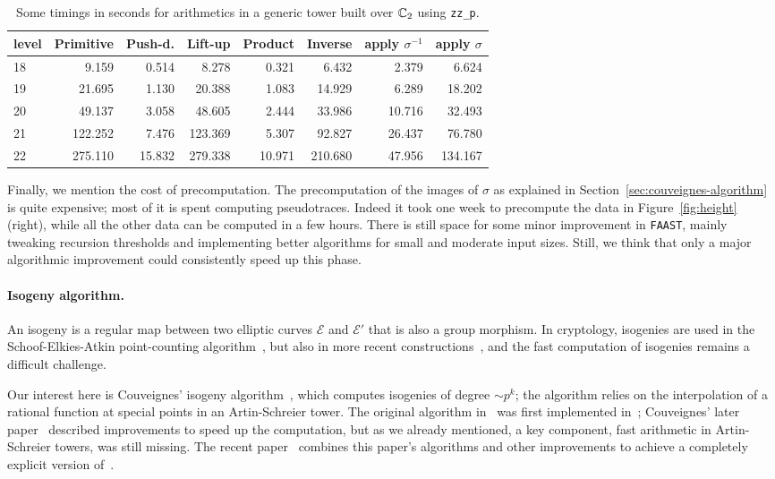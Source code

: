 \begin{table}
  \centering
  \begin{tabular}{l | r | r | r | r | r | r | r}
    level & Primitive & Push-d. & Lift-up & Product & Inverse & apply $\sigma^{-1}$ & apply $\sigma$ \\
    \hline
    18 &   9.159 &  0.514 &   8.278 &  0.321 &   6.432 &  2.379 &   6.624\\
    19 &  21.695 &  1.130 &  20.388 &  1.083 &  14.929 &  6.289 &  18.202\\
    20 &  49.137 &  3.058 &  48.605 &  2.444 &  33.986 & 10.716 &  32.493\\
    21 & 122.252 &  7.476 & 123.369 &  5.307 &  92.827 & 26.437 &  76.780\\
    22 & 275.110 & 15.832 & 279.338 & 10.971 & 210.680 & 47.956 & 134.167\\
  \end{tabular}
  \caption{Some timings in seconds for arithmetics in a generic tower built over $\mathbb{C}_2$ using \texttt{zz\_p}.}
  \label{tab:arith-zzp}
\end{table}


Finally, we mention the cost of precomputation. The precomputation of
the images of $\sigma$ as explained in
Section~\ref{sec:couveignes-algorithm} is quite expensive;
most of it is spent computing pseudotraces. Indeed it took one week to
precompute the data in Figure~\ref{fig:height} (right), while all the
other data can be computed in a few hours. There is still space for
some minor improvement in \texttt{FAAST}, mainly tweaking recursion
thresholds and implementing better algorithms for small and moderate
input sizes. Still, we think that only a major algorithmic improvement
could consistently speed up this phase.


\paragraph*{\bf Isogeny algorithm.} An isogeny is a regular map
between two elliptic curves $\mathscr{E}$ and $\mathscr{E}'$ that is
also a group morphism.  In cryptology, isogenies are used in the
Schoof-Elkies-Atkin point-counting algorithm~\cite{BlSeSm99}, but also
in more recent constructions~\cite{RoSt06,Teske06}, and the fast
computation of isogenies remains a difficult challenge.

Our interest here is Couveignes' isogeny
algorithm~\cite{Couveignes96}, which computes isogenies of degree
$\sim p^k$; the algorithm relies on the interpolation of a rational
function at special points in an Artin-Schreier tower. The original
algorithm in~\cite{Couveignes96} was first implemented
in~\cite{Lercier97}; Couveignes' later paper~\cite{Couveignes00}
described improvements to speed up the computation, but as we already
mentioned, a key component, fast arithmetic in Artin-Schreier towers,
was still missing. The recent paper~\cite{DeFeo10} combines this
paper's algorithms and other improvements to achieve a completely
explicit version of~\cite{Couveignes00}.

